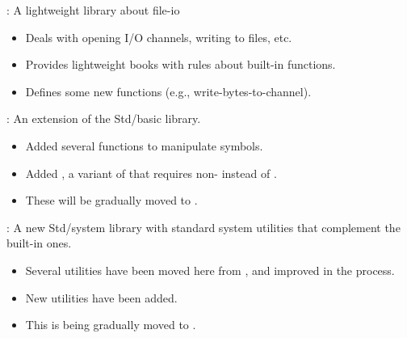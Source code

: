 
\begin{frame}

\newlibtitle

: A lightweight library about file-io
\begin{itemize}
\item Deals with opening I/O channels, writing to files, etc.
\item Provides lightweight books with rules about built-in functions.
\item Defines some new functions (e.g., write-bytes-to-channel).
\end{itemize}

\end{frame}


\begin{frame}

\newlibtitle

:
An extension of the Std/basic library.
\begin{itemize}
\item
Added several functions to manipulate symbols.
\item
Added , a variant of 
that requires non- instead of .
\item
These will be gradually moved to .
\end{itemize}

\separation

:
A new Std/system library
with standard system utilities
that complement the built-in ones.
\begin{itemize}
\item
Several utilities have been moved here from ,
and improved in the process.
\item
New utilities have been added.
\item
This is being gradually moved to .
\end{itemize}

\end{frame}


